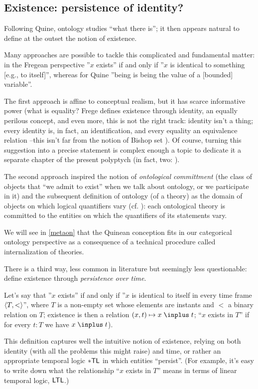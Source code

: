 \subsection{Existence: persistence of identity?} \label{existence}
Following Quine, ontology studies ``what there is''; it then appears natural to define at the outset the notion of existence.

Many approaches are possible to tackle this complicated and fundamental matter: in the Fregean perspective \cite{Frege} ''$x$ exists'' if and only if ''$x$ is identical to something [e.g., to itself]'', whereas for Quine \cite{Qui53} ''being is being the value of a [bounded] variable''.

The first approach is affine to conceptual realism, but it has scarce informative power (what is equality? Frege defines existence through identity, an equally perilous concept, and even more, this is not the right track: identity isn't a thing; every identity is, in fact, an identification, and every equality an equivalence relation --this isn't far from the notion of Bishop set \cite{}). Of course, turning this suggestion into a precise statement is complex enough a topic to dedicate it a separate chapter of the present polyptych (in fact, two: \cite{black,homot}).

The second approach inspired the notion of \emph{ontological committment} (the class of objects that ``we admit to exist'' when we talk about ontology, or we participate in it) and the subsequent definition of ontology (of a theory) as the domain of objects on which logical quantifiers vary (cf. \cite{Qui53}): each ontological theory is committed to the entities on which the quantifiers of its statements vary.

We will see in \autoref{metaon} that the Quinean conception fits in our categorical ontology perspective as a consequence of a technical procedure called internalization of theories.

There is a third way, less common in literature but seemingly less questionable: define existence through \emph{persistence over time}.

Let's say that ''$x$ exists'' if and only if ''$x$ is identical to itself in every time frame $\langle T, <\rangle$'', where $T$ is a non-empty set whose elements are instants and $<$ a binary relation on $T$; existence is then a relation $ (x, t) \mapsto x \mathrel \inplus t $; ``$ x $ exists in $ T $'' if for every $ t: T $ we have $ x \mathrel \inplus t $).

This definition captures well the intuitive notion of existence, relying on both identity (with all the problems this might raise) and time, or rather an appropriate temporal logic $\sf *TL$ in which entities ``persist''. (For example, it's easy to write down what the relationship ``$x$ exists in $T$'' means in terms of linear temporal logic, $\sf LTL$.)

